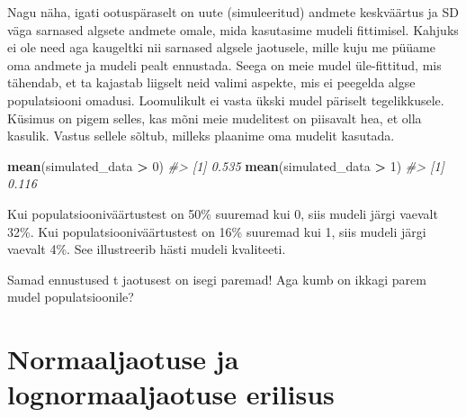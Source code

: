 \documentclass[]{book}
\newenvironment{Shaded}{\begin{snugshade}}{\end{snugshade}}
\newcommand{\CommentTok}[1]{\textcolor[rgb]{0.56,0.35,0.01}{\textit{#1}}}
\newcommand{\DecValTok}[1]{\textcolor[rgb]{0.00,0.00,0.81}{#1}}
\newcommand{\KeywordTok}[1]{\textcolor[rgb]{0.13,0.29,0.53}{\textbf{#1}}}
\newcommand{\NormalTok}[1]{#1}
\newcommand{\OperatorTok}[1]{\textcolor[rgb]{0.81,0.36,0.00}{\textbf{#1}}}
\newcommand{\StringTok}[1]{\textcolor[rgb]{0.31,0.60,0.02}{#1}}
\begin{document}
Nagu näha, igati ootuspäraselt on uute (simuleeritud) andmete keskväärtus ja SD väga sarnased algsete andmete omale, mida kasutasime mudeli fittimisel.
Kahjuks ei ole need aga kaugeltki nii sarnased algsele jaotusele, mille kuju me püüame oma andmete ja mudeli pealt ennustada.
Seega on meie mudel üle-fittitud, mis tähendab, et ta kajastab liigselt neid valimi aspekte, mis ei peegelda algse populatsiooni omadusi.
Loomulikult ei vasta ükski mudel päriselt tegelikkusele.
Küsimus on pigem selles, kas mõni meie mudelitest on piisavalt hea, et olla kasulik.
Vastus sellele sõltub, milleks plaanime oma mudelit kasutada.

\begin{Shaded}
\begin{Highlighting}[]
\KeywordTok{mean}\NormalTok{(simulated_data }\OperatorTok{>}\StringTok{ }\DecValTok{0}\NormalTok{) }
\CommentTok{#> [1] 0.535}
\KeywordTok{mean}\NormalTok{(simulated_data }\OperatorTok{>}\StringTok{ }\DecValTok{1}\NormalTok{)}
\CommentTok{#> [1] 0.116}
\end{Highlighting}
\end{Shaded}

Kui populatsiooniväärtustest on 50\% suuremad kui 0, siis mudeli järgi vaevalt 32\%. Kui populatsiooniväärtustest on 16\% suuremad kui 1, siis mudeli järgi vaevalt 4\%.
See illustreerib hästi mudeli kvaliteeti.

\begin{Shaded}
\end{Shaded}

Samad ennustused t jaotusest on isegi paremad! Aga kumb on ikkagi parem mudel populatsioonile?

\hypertarget{normaaljaotuse-ja-lognormaaljaotuse-erilisus}{%
\section*{Normaaljaotuse ja lognormaaljaotuse erilisus}\label{normaaljaotuse-ja-lognormaaljaotuse-erilisus}}
\end{document}
